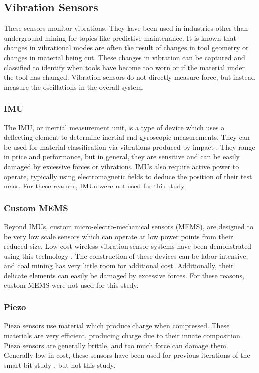 \subsection{Vibration Sensors}

These sensors monitor vibrations. They have been used in industries other than underground mining
for topics like predictive maintenance. It is known that changes in vibrational modes are often
the result of changes in tool geometry or changes in material being cut. These changes in 
vibration can be captured and classified to identify when tools have become too worn or if the
material under the tool has changed. Vibration sensors do not directly measure force, but instead
measure the oscillations in the overall system.

\subsubsection{IMU}
The IMU, or inertial measurement unit, is a type of device which uses a deflecting element
to determine inertial and gyroscopic measurements. 
They can be used for material classification via vibrations produced by impact \cite{9981139}.
They range in price and performance, but
in general, they are sensitive and can be easily damaged by excessive forces or vibrations.
IMUs also require active power to operate, typically using electromagnetic fields to deduce the 
position of their test mass. For these reasons, IMUs were not used for this study.

\subsubsection{Custom MEMS}
Beyond IMUs, custom micro-electro-mechanical sensors (MEMS), are designed to be very low scale
sensors which can operate at low power points from their reduced size. 
Low cost wireless vibration sensor systems have been demonstrated using this technology \cite{9234762}.
The construction of these devices can be labor intensive, and coal mining has very little room for additional cost. 
Additionally, their delicate elements can easily be damaged by excessive forces. 
For these reasons, custom MEMS were not used for this study.

\subsubsection{Piezo}
Piezo sensors use material which produce charge when compressed. 
These materials are very efficient, producing charge due to their innate composition.
Piezo sensors are generally brittle, and too much force can damage them.
Generally low in cost, these sensors have been used for 
previous iterations of the smart bit study \cite{11124/170545}, but not this study.

